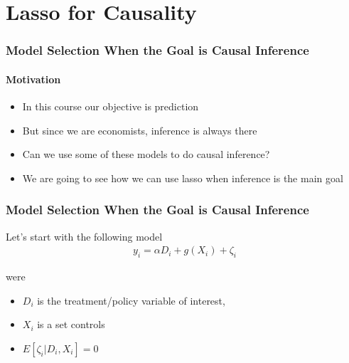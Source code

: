 \documentclass[
  shownotes,
  xcolor={svgnames},
  hyperref={colorlinks,citecolor=DarkBlue,linkcolor=DarkRed,urlcolor=DarkBlue}
  , aspectratio=169]{beamer}
\begin{document}
\section{Lasso for Causality}
\begin{frame}[fragile]
\frametitle{Model Selection When the Goal is Causal Inference}
\framesubtitle{Motivation}


\begin{itemize}
\item In this course our objective is prediction
\medskip
\pause
\item But since we are economists, inference is always there
\pause
\medskip
\item Can we use some of these models to do causal inference?
\medskip

\item We are going to see how we can use lasso when inference is the main goal
\end{itemize}

\end{frame}
\begin{frame}[fragile]
\frametitle{Model Selection When the Goal is Causal Inference}

Let's start with the following model
\medskip
\begin{align}
  y_i = \alpha D_i + g(X_i) + \zeta_i
\end{align}

\medskip

were 

\begin{itemize}
\item $D_i$ is the treatment/policy variable of interest, 
\item $X_i$ is a set controls
\item $E[\zeta_i|D_i,X_i]=0$
\end{itemize}
\end{frame}
\end{document}

